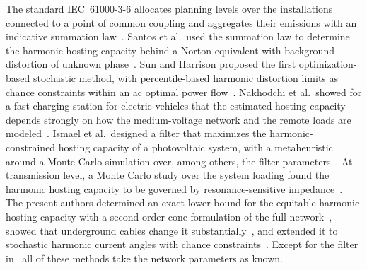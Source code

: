 The standard IEC~61000-3-6 allocates planning levels over the installations connected to a point of common coupling and aggregates their emissions with an indicative summation law~\cite{noauthor_iec61000-3-6_2008}. Santos et al.\ used the summation law to determine the harmonic hosting capacity behind a Norton equivalent with background distortion of unknown phase~\cite{santos_considerations_2015}. Sun and Harrison proposed the first optimization-based stochastic method, with percentile-based harmonic distortion limits as chance constraints within an ac optimal power flow~\cite{sun_distribution_2022}. Nakhodchi et al.\ showed for a fast charging station for electric vehicles that the estimated hosting capacity depends strongly on how the medium-voltage network and the remote loads are modeled~\cite{nakhodchi_impact_2023}. Ismael et al.\ designed a filter that maximizes the harmonic-constrained hosting capacity of a photovoltaic system, with a metaheuristic around a Monte Carlo simulation over, among others, the filter parameters~\cite{ismael_probabilistic_2019}. At transmission level, a Monte Carlo study over the system loading found the harmonic hosting capacity to be governed by resonance-sensitive impedance~\cite{emini_study_2026}. The present authors determined an exact lower bound for the equitable harmonic hosting capacity with a second-order cone formulation of the full network~\cite{vanacker_hosting_2026}, showed that underground cables change it substantially~\cite{vanacker_impact_2025}, and extended it to stochastic harmonic current angles with chance constraints~\cite{vanacker_shhc}. Except for the filter in~\cite{ismael_probabilistic_2019} all of these methods take the network parameters as known.

